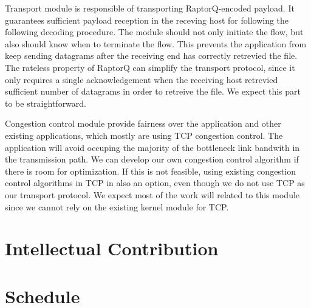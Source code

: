 \documentclass{sig-alternate-10pt}
\begin{document}
Transport module is responsible of transporting RaptorQ-encoded payload. It
guarantees sufficient payload reception in the receving host for following the
following decoding procedure. The module should not only initiate the flow, but
also should know when to terminate the flow. This prevents the application from
keep sending datagrams after the receiving end has correctly retrevied the file.
The rateless property of RaptorQ can simplify the transport protocol, since it
only requires a single acknowledgement when the receiving host retrevied
sufficient number of datagrams in order to retreive the file. We expect this
part to be straightforward.

Congestion control module provide fairness over the application and other
existing applications, which mostly are using TCP congestion control. The
application will avoid occuping the majority of the bottleneck link bandwith in
the transmission path. We can develop our own congestion control algorithm if
there is room for optimization. If this is not feasible, using existing
congestion control algorithms in TCP in also an option, even though we do not
use TCP as our transport protocol. We expect most of the work will related to
this module since we cannot rely on the existing kernel module for TCP.

\section{Intellectual Contribution}

\section{Schedule}



\end{document}
